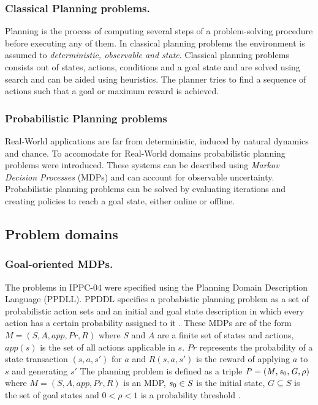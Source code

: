 \documentclass[runningheads,a4paper]{llncs}
\begin{document}
\subsubsection{Classical Planning problems. } Planning is the process of computing several steps of a problem-solving procedure before executing any of them. In classical planning problems the environment is assumed to \emph{deterministic, observable and state}. Classical planning problems consists out of states, actions, conditions and a goal state and are solved using search and can be aided using heuristics. The planner tries to find a sequence of actions such that a goal or maximum reward is achieved. 

\subsubsection{Probabilistic Planning problems} 
Real-World applications are far from deterministic, induced by natural dynamics and chance. To accomodate for Real-World domains probabilistic planning problems were introduced.  These systems can be described using \emph{Markov Decision Processes} (MDPs) and can account for observable uncertainty. Probabilistic planning problems can be solved by evaluating iterations and creating policies to reach a goal state, either online or offline. 

\subsection{Problem domains}
\subsubsection{Goal-oriented MDPs. }The problems in IPPC-04 were specified using the Planning Domain Description Language (PPDLL). PPDDL specifies a probabistic planning problem as a set of probabilistic action sets and an initial and goal state description in which every action has a certain probability assigned to it \cite{FFReplan}. These MDPs are of the form $\mathit{M = (S, A, app, Pr, R)}$ where $\mathit{S}$ and $\mathit{A}$ are a finite set of states and actions, $\mathit{app(s)}$ is the set of all actions applicable in $\mathit{s}$. $\mathit{Pr}$ represents the probability of a state transaction $\mathit{(s, a, s')}$ for $\mathit{a}$ and $\mathit{R(s, a, s')}$ is the reward of applying $\mathit{a}$ to $\mathit{s}$ and generating $\mathit{s'}$ The planning problem is defined as a triple $\mathit{P = (M, s\textsubscript{0}, G, \rho)}$ where $\mathit{M = (S, A, app, Pr, R)}$ is an MDP, $\mathit{s\textsubscript{0} \in S}$ is the initial state, $\mathit{G \subseteq S}$ is the set of goal states and $\mathit{0 < \rho < 1}$ is a probability threshold \cite{teichteil2010incremental}.
\end{document}
